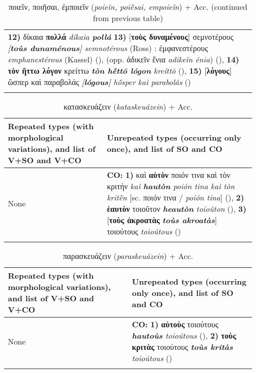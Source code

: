\documentclass[output=paper,colorlinks,citecolor=brown]{langscibook}
\begin{document}
\begin{table}
\begin{tabularx}{\textwidth}{QQ}
        \textbf{12)} δίκαια \textbf{πολλά} \textit{díkaia \textbf{pollá}}
        \textbf{13)} [\textbf{τοὺς δυναμένους}] σεμνοτέρους \textit{[\textbf{toùs dunaménous}] semnotérous} (Ross) : ἐμφανεστέρους \textit{emphanestérous} (Kassel) (), (opp. ἀδικεῖν ἔνια \textit{adikeĩn énia}) (),
        \textbf{14)} \textbf{τὸν ἥττω λόγον} κρείττω \textit{\textbf{tòn hḗttō lógon} kreíttō} (),
        \textbf{15)} [\textbf{λόγους}] ὥσπερ καὶ παραβολάς \textit{[\textbf{lógous}] hṓsper kaì parabolás} ()\\
        \lspbottomrule
\end{tabularx}
\caption{{ποιεῖν, ποιῆσαι, ἐμποιεῖν (\textit{poieĩn, poiē̃sai,  empoieĩn})} + Acc. (continued from previous table)}
\end{table}


\begin{table}
\footnotesize
\begin{tabularx}{\textwidth}{QQ}
        \lsptoprule
        Repeated types (with morphological variations), and list of V+SO and V+CO & Unrepeated types (occurring only once), and list of SO and CO     \\
        \midrule
        None&\textbf{CO:} \newline
        \textbf{1)} καὶ \textbf{αὑτὸν} ποιόν τινα καὶ τὸν κριτήν \textit{kaì \textbf{hautòn} poión tina kaì tòn kritḕn} [sc. ποιόν τινα / \textit{poión tina}] (),\newline
        \textbf{2)} \textbf{ἑαυτὸν} τοιοῦτον \textit{\textbf{heautòn} toioũton} (),\newline
        \textbf{3)} [\textbf{τοὺς ἀκροατὰς} \textit{\textbf{toùs akroatàs}}] τοιούτους \textit{toioútous} ()\\
        \lspbottomrule
\end{tabularx}
\caption{{κατασκευάζειν (\textit{kataskeuázein})} + Acc.}
\end{table}


\begin{table}
\footnotesize
\begin{tabularx}{\textwidth}{QQ}
        \lsptoprule
        Repeated types (with morphological variations), and list of V+SO and V+CO & Unrepeated types (occurring only once), and list of SO and CO     \\
        \midrule
        None&\textbf{CO:} \newline
        \textbf{1)} \textbf{αὑτοὺς} τοιούτους \textit{\textbf{hautoùs} toioútous} (),\newline
        \textbf{2)} \textbf{τοὺς κριτὰς} τοιούτους \textit{\textbf{toùs kritàs} toioútous} ()\\
        \lspbottomrule
\end{tabularx}
\caption{{παρασκευάζειν (\textit{paraskeuázein})} + Acc.}
\end{table}
\end{document}
